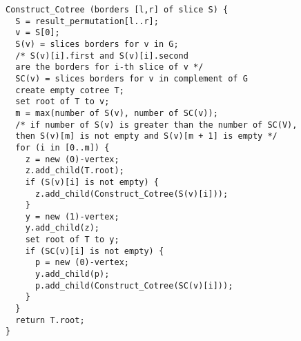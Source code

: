 \begin{verbatim}
Construct_Cotree (borders [l,r] of slice S) {
  S = result_permutation[l..r];
  v = S[0];
  S(v) = slices borders for v in G; 
  /* S(v)[i].first and S(v)[i].second 
  are the borders for i-th slice of v */
  SC(v) = slices borders for v in complement of G
  create empty cotree T;
  set root of T to v;
  m = max(number of S(v), number of SC(v)); 
  /* if number of S(v) is greater than the number of SC(V),
  then S(v)[m] is not empty and S(v)[m + 1] is empty */
  for (i in [0..m]) {
    z = new (0)-vertex;
    z.add_child(T.root);
    if (S(v)[i] is not empty) { 
      z.add_child(Construct_Cotree(S(v)[i]));
    }
    y = new (1)-vertex;
    y.add_child(z);
    set root of T to y;
    if (SC(v)[i] is not empty) {
      p = new (0)-vertex;
      y.add_child(p);
      p.add_child(Construct_Cotree(SC(v)[i]));
    }
  }
  return T.root;
}
\end{verbatim}